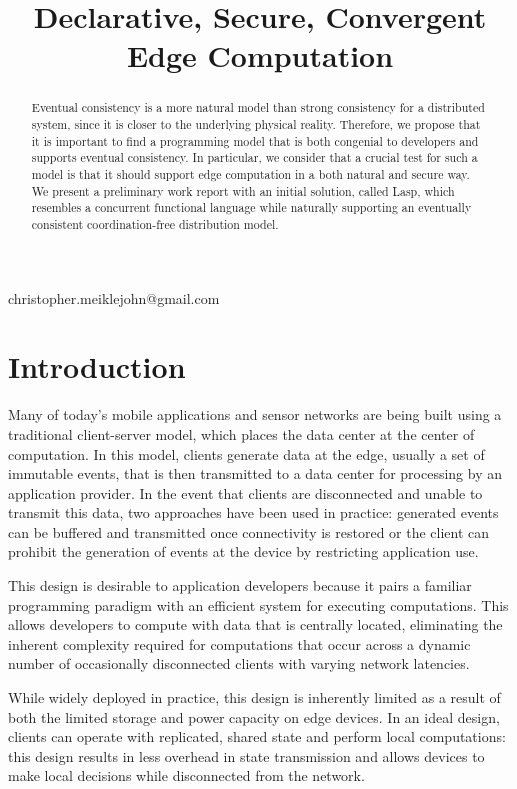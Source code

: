 \documentclass[nocopyrightspace, preprint]{sigplanconf}
\theoremstyle{definition}
\theoremstyle{remark}
\begin{document}
\title{Declarative, Secure, Convergent Edge Computation}

           {}
           {christopher.meiklejohn@gmail.com}
\maketitle



\begin{abstract}
Eventual consistency is a more natural model than strong consistency for a distributed system, since it is closer to the underlying physical reality.  Therefore, we propose that it is important to find a programming model that is both congenial to developers and supports eventual consistency.  In particular, we consider that a crucial test for such a model is that it should support edge computation in a both natural and secure way.  We present a preliminary work report with an initial solution, called Lasp, which resembles a concurrent functional language while naturally supporting an eventually consistent coordination-free distribution model.
\end{abstract}

\section{Introduction}
Many of today's mobile applications and sensor networks are being built using a traditional client-server model, which places the data center at the center of computation.  In this model, clients generate data at the edge, usually a set of immutable events, that is then transmitted to a data center for processing by an application provider.  In the event that clients are disconnected and unable to transmit this data, two approaches have been used in practice: generated events can be buffered and transmitted once connectivity is restored or the client can prohibit the generation of events at the device by restricting application use.

This design is desirable to application developers because it pairs a familiar programming paradigm with an efficient system for executing computations.  This allows developers to compute with data that is centrally located, eliminating the inherent complexity required for computations that occur across a dynamic number of occasionally disconnected clients with varying network latencies.

While widely deployed in practice, this design is inherently limited as a result of both the limited storage and power capacity on edge devices.  In an ideal design, clients can operate with replicated, shared state and perform local computations: this design results in less overhead in state transmission and allows devices to make local decisions while disconnected from the network.
\end{document}
